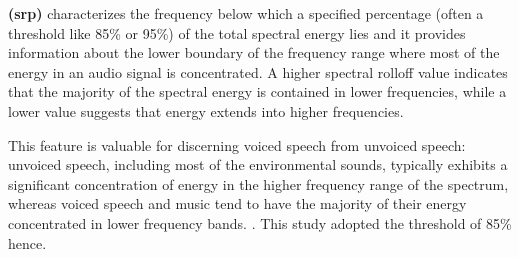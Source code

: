 


\textbf{ (\gls{srp})} characterizes the frequency below which a specified percentage (often a threshold like 85\% or 95\%) of the total spectral energy lies and it provides information about the lower boundary of the frequency range where most of the energy in an audio signal is concentrated. A higher spectral rolloff value indicates that the majority of the spectral energy is contained in lower frequencies, while a lower value suggests that energy extends into higher frequencies.%


This feature is valuable for discerning voiced speech from unvoiced speech: unvoiced speech, including most of the environmental sounds, typically exhibits a significant concentration of energy in the higher frequency range of the spectrum, whereas voiced speech and music tend to have the majority of their energy concentrated in lower frequency bands. \cite{Giannakopoulos2014}. This study adopted the threshold of 85\% hence.%

